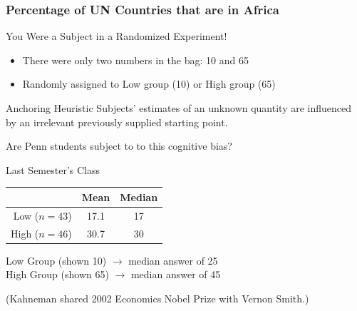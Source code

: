 \begin{frame}
\frametitle{Percentage of UN Countries that are in Africa}
\begin{block}{You Were a Subject in a Randomized Experiment!}
	\begin{itemize}
		\item There were only two numbers in the bag: 10 and 65
		\item Randomly assigned to Low group (10) or High group (65)
	\end{itemize}
	\end{block} \pause
\begin{block}{Anchoring Heuristic \href{http://www.jstor.org/stable/1738360}{}}
	Subjects' estimates of an unknown quantity are influenced by an irrelevant previously supplied starting point.
\end{block}
\begin{alertblock}{Are Penn students subject to to this cognitive bias?}
\end{alertblock}
\end{frame}
\begin{frame}
\begin{block}{Last Semester's Class}
	\begin{table}[h]
		\begin{tabular}{r|cc}
					& Mean & Median\\
					\hline
			Low ($n=43$)& 17.1&17\\
			High ($n=46$)& 30.7&30
		\end{tabular}
	\end{table}
\end{block}
\pause
\begin{block}{\href{http://www.jstor.org/stable/1738360}{}}
Low Group (shown 10) $\rightarrow$ median answer of 25\\
High Group (shown 65) $\rightarrow$ median answer of 45
\end{block}

\vspace{2em}
\alert{ \footnotesize (Kahneman shared 2002 Economics Nobel Prize with Vernon Smith.)}
\end{frame}

